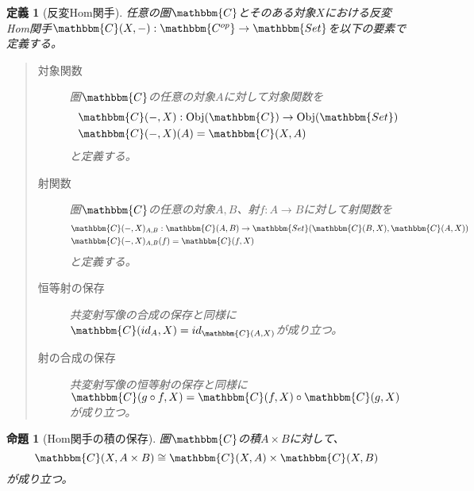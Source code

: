 \documentclass[dvipdfmx]{jsarticle}
\newcommand{\cat}[1]{\mathbbm{#1}}
\newcommand{\arrow}{\rightarrow}
\newcommand{\functor}[3]{#1:\cat{#2}\arrow \cat{#3}}
\newcommand{\obj}[1]{\mathrm{Obj}(\cat{#1})}
\newcommand{\mor}[3]{#1:#2\arrow #3}
\newcommand{\arset}[3]{\cat{#1}(#2,#3)}
\newtheorem{prop}{命題}[section]
\newtheorem{define}{定義}[section]
\numberwithin{proof}{subsection}
\numberwithin{prop}{subsection}
\numberwithin{define}{subsection}
\begin{document}
		\begin{define}[反変Hom関手]
		任意の圏$\cat{C}$とそのある対象$X$における反変Hom関手$\functor{\arset{C}{X}{-}}{C^{op}}{Set}$を以下の要素で定義する。
		\begin{quote}
			\begin{description}
				\item[対象関数] 圏$\cat{C}$の任意の対象$A$に対して対象関数を
				\begin{align*}
					&\mor{\arset{C}{-}{X}}{\obj{C}}{\obj{Set}}\\
					&\arset{C}{-}{X}(A)=\arset{C}{X}{A}
				\end{align*}
				と定義する。
				\item[射関数] 圏$\cat{C}$の任意の対象$A,B$、射$\mor{f}{A}{B}$に対して射関数を
				\begin{align*}
					&\mor{\arset{C}{-}{X}_{A,B}}{\arset{C}{A}{B}}{\arset{Set}{\arset{C}{B}{X}}{\arset{C}{A}{X}}}\\
					&\arset{C}{-}{X}_{A,B}(f)=\arset{C}{f}{X}
				\end{align*}
				と定義する。
				\begin{center}
				\end{center}
				\item[恒等射の保存] 共変射写像の合成の保存と同様に$\arset{C}{id_A}{X}=id_{\arset{C}{A}{X}}$が成り立つ。
				\item[射の合成の保存] 共変射写像の恒等射の保存と同様に$\arset{C}{g\circ f}{X}=\arset{C}{f}{X}\circ\arset{C}{g}{X}$が成り立つ。
			\end{description}
		\end{quote}
	\end{define}
	\begin{prop}[Hom関手の積の保存]
		圏$\cat{C}$の積$A\times B$に対して、\[\arset{C}{X}{A\times B}\cong \arset{C}{X}{A}\times \arset{C}{X}{B}\]が成り立つ。
	\end{prop}
\end{document}
